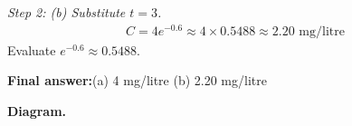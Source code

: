 \documentclass[11pt]{article}
\begin{document}
\textit{Step 2: (b) Substitute \( t = 3 \).}
\[\begin{gathered}
C = 4e^{-0.6} \approx 4 \times 0.5488 \approx 2.20 \text{ mg/litre}
\end{gathered}\]
Evaluate \( e^{-0.6} \approx 0.5488 \).

\begin{answerbox}
\textbf{Final answer:}\quad (a) 4 mg/litre \quad  (b) 2.20 mg/litre
\end{answerbox}
\textbf{Diagram.}

\begin{center}
\end{center}
\end{document}
